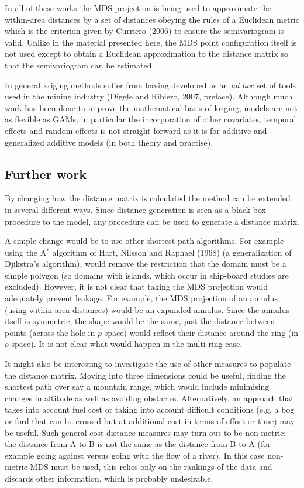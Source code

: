 \documentclass[useAMS, referee]{biom}
\begin{document}
In all of these works the MDS projection is being used to approximate the within-area distances by a set of distances obeying the rules of a Euclidean metric which is the criterion given by Curriero (2006) to ensure the semivariogram is valid. Unlike in the material presented here, the MDS point configuration itself is not used except to obtain a Euclidean approximation to the distance matrix so that the semivariogram can be estimated.

In general kriging methods suffer from having developed as an \textit{ad hoc} set of tools used in the mining industry (Diggle and Ribiero, 2007, preface). Although much work has been done to improve the mathematical basis of kriging, models are not as flexible as GAMs, in particular the incorporation of other covariates, temporal effects and random effects is not straight forward as it is for additive and generalized additive models (in both theory and practise).

\subsection{Further work}
\label{s:furtherwork}

By changing how the distance matrix is calculated the method can be extended in several different ways. Since distance generation is seen as a black box procedure to the model, any procedure can be used to generate a distance matrix.

A simple change would be to use other shortest path algorithms. For example using the A$^*$ algorithm of Hart, Nilsson and Raphael (1968) (a generalization of Djikstra's algorithm), would remove the restriction that the domain must be a simple polygon (so domains with islands, which occur in ship-board studies are excluded). However, it is not clear that taking the MDS projection would adequately prevent leakage. For example, the MDS projection of an annulus (using within-area distances) would be an expanded annulus. Since the annulus itself is symmetric, the shape would be the same, just the distance between points (across the hole in $p$-space) would reflect their distance around the ring (in $o$-space). It is not clear what would happen in the multi-ring case.

It might also be interesting to investigate the use of other measures to populate the distance matrix. Moving into three dimensions could be useful, finding the shortest path over say a mountain range, which would include minimising changes in altitude as well as avoiding obstacles. Alternatively, an approach that takes into account fuel cost or taking into account difficult conditions (e.g. a bog or ford that can be crossed but at additional cost in terms of effort or time) may be useful. Such general cost-distance measures may turn out to be non-metric: the distance from A to B is not the same as the distance from B to A (for example going against versus going with the flow of a river). In this case non-metric MDS must be used, this relies only on the rankings of the data and discards other information, which is probably undesirable.
\end{document}
